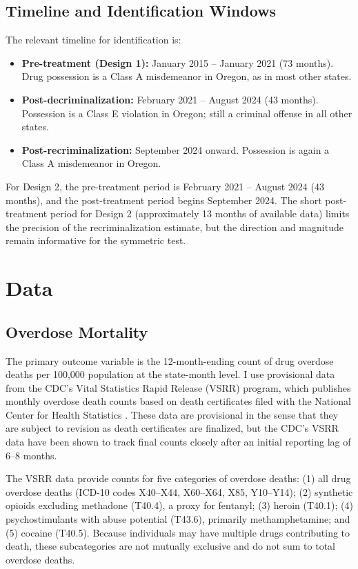\documentclass[12pt]{article}
\begin{document}
\subsection{Timeline and Identification Windows}

The relevant timeline for identification is:
\begin{itemize}
    \item \textbf{Pre-treatment (Design 1):} January 2015 -- January 2021 (73 months). Drug possession is a Class A misdemeanor in Oregon, as in most other states.
    \item \textbf{Post-decriminalization:} February 2021 -- August 2024 (43 months). Possession is a Class E violation in Oregon; still a criminal offense in all other states.
    \item \textbf{Post-recriminalization:} September 2024 onward. Possession is again a Class A misdemeanor in Oregon.
\end{itemize}

For Design 2, the pre-treatment period is February 2021 -- August 2024 (43 months), and the post-treatment period begins September 2024. The short post-treatment period for Design 2 (approximately 13 months of available data) limits the precision of the recriminalization estimate, but the direction and magnitude remain informative for the symmetric test.


\section{Data}

\subsection{Overdose Mortality}

The primary outcome variable is the 12-month-ending count of drug overdose deaths per 100,000 population at the state-month level. I use provisional data from the CDC's Vital Statistics Rapid Release (VSRR) program, which publishes monthly overdose death counts based on death certificates filed with the National Center for Health Statistics \citep{cdc2023vsrr}. These data are provisional in the sense that they are subject to revision as death certificates are finalized, but the CDC's VSRR data have been shown to track final counts closely after an initial reporting lag of 6--8 months.

The VSRR data provide counts for five categories of overdose deaths: (1) all drug overdose deaths (ICD-10 codes X40--X44, X60--X64, X85, Y10--Y14); (2) synthetic opioids excluding methadone (T40.4), a proxy for fentanyl; (3) heroin (T40.1); (4) psychostimulants with abuse potential (T43.6), primarily methamphetamine; and (5) cocaine (T40.5). Because individuals may have multiple drugs contributing to death, these subcategories are not mutually exclusive and do not sum to total overdose deaths.
\end{document}
